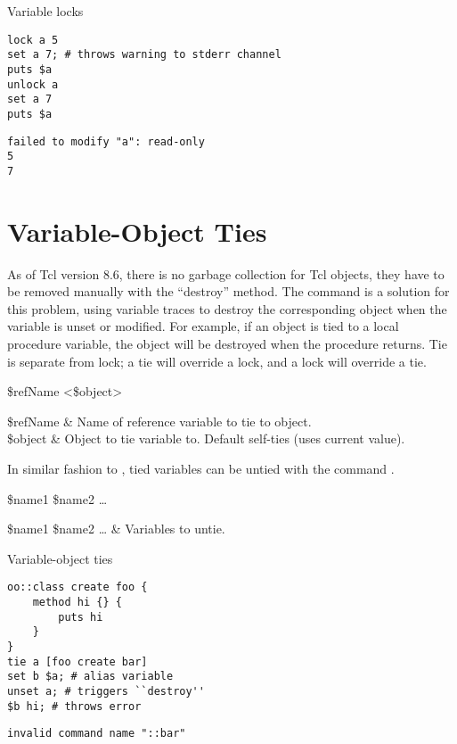 \documentclass{article}
\begin{document}
\begin{example}{Variable locks}
\begin{lstlisting}
lock a 5
set a 7; # throws warning to stderr channel
puts $a
unlock a
set a 7
puts $a
\end{lstlisting}
\tcblower
\begin{lstlisting}
failed to modify "a": read-only
5
7
\end{lstlisting}
\end{example}

\clearpage

\section{Variable-Object Ties}
As of Tcl version 8.6, there is no garbage collection for Tcl objects, they have to be removed manually with the ``destroy'' method. 
The command  is a solution for this problem, using variable traces to destroy the corresponding object when the variable is unset or modified. 
For example, if an object is tied to a local procedure variable, the object will be destroyed when the procedure returns.
Tie is separate from lock; a tie will override a lock, and a lock will override a tie. 
\begin{syntax}
 \$refName <\$object>
\end{syntax}
\begin{args}
\$refName & Name of reference variable to tie to object. \\
\$object & Object to tie variable to. Default self-ties (uses current value).
\end{args}

In similar fashion to , tied variables can be untied with the command .

\begin{syntax}
 \$name1 \$name2 …
\end{syntax}
\begin{args}
\$name1 \$name2 … & Variables to untie.
\end{args}

\begin{example}{Variable-object ties}
\begin{lstlisting}
oo::class create foo {
    method hi {} {
        puts hi
    }
}
tie a [foo create bar]
set b $a; # alias variable
unset a; # triggers ``destroy''
$b hi; # throws error
\end{lstlisting}
\tcblower
\begin{lstlisting}
invalid command name "::bar"
\end{lstlisting}
\end{example}
\clearpage
\end{document}
